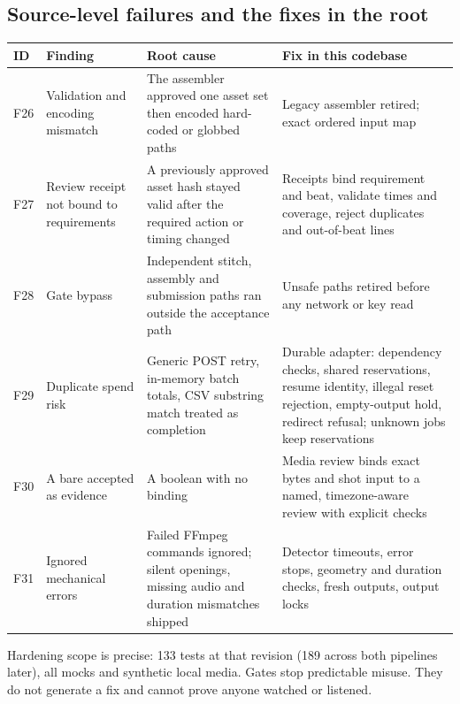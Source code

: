 \documentclass[11pt,a4paper]{article}
\newcommand{\code}[1]{\texttt{\detokenize{#1}}}
\begin{document}
\subsection{Source-level failures and the fixes in the root}
\begin{longtable}{@{}P{1.0cm}P{4.6cm}P{4.7cm}P{5.2cm}@{}}
\toprule \textbf{ID} & \textbf{Finding} & \textbf{Root cause} & \textbf{Fix in this codebase}\\ \midrule\endhead
F26 & Validation and encoding mismatch & The assembler approved one asset set then encoded hard-coded or globbed paths & Legacy assembler retired; exact ordered input map\\
F27 & Review receipt not bound to requirements & A previously approved asset hash stayed valid after the required action or timing changed & Receipts bind requirement and beat, validate times and coverage, reject duplicates and out-of-beat lines\\
F28 & Gate bypass & Independent stitch, assembly and submission paths ran outside the acceptance path & Unsafe paths retired before any network or key read\\
F29 & Duplicate spend risk & Generic POST retry, in-memory batch totals, CSV substring match treated as completion & Durable adapter: dependency checks, shared reservations, resume identity, illegal reset rejection, empty-output hold, redirect refusal; unknown jobs keep reservations\\
F30 & A bare \code{pixel_checked=True} accepted as evidence & A boolean with no binding & Media review binds exact bytes and shot input to a named, timezone-aware review with explicit checks\\
F31 & Ignored mechanical errors & Failed FFmpeg commands ignored; silent openings, missing audio and duration mismatches shipped & Detector timeouts, error stops, geometry and duration checks, fresh outputs, output locks\\
\bottomrule
\end{longtable}
Hardening scope is precise: 133 tests at that revision (189 across both pipelines later), all mocks and synthetic local media. Gates stop predictable misuse. They do not generate a fix and cannot prove anyone watched or listened.
\end{document}
